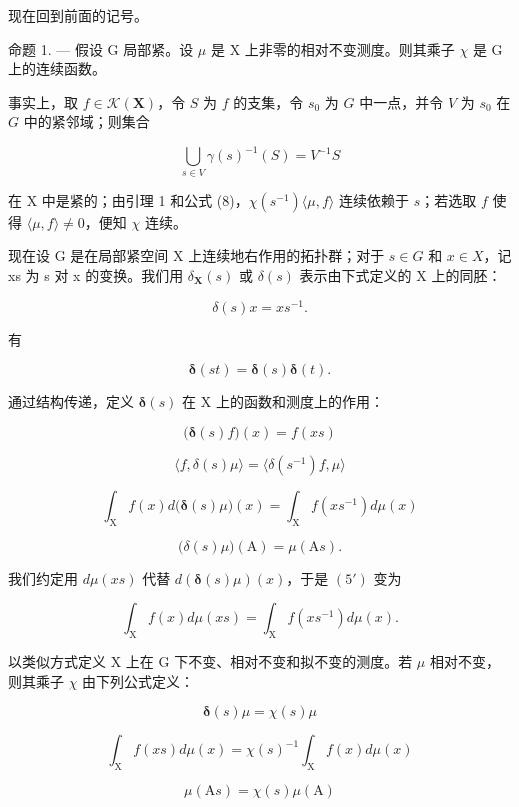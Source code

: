 现在回到前面的记号。

命题 1. --- 假设 G 局部紧。设 \(\mu\) 是 X 上非零的相对不变测度。则其乘子 \(\chi\) 是 G 上的连续函数。

事实上，取 \(f \in \mathcal{K}(\mathbf{X})\)，令 \(S\) 为 \(f\) 的支集，令 \(s_0\) 为 \(G\) 中一点，并令 \(V\) 为 \(s_0\) 在 \(G\) 中的紧邻域；则集合

\[
\bigcup_ {s \in V} \gamma (s) ^ {- 1} (S) = V ^ {- 1} S
\]

在 X 中是紧的；由引理 1 和公式 (8)，\(\chi(s^{-1})\langle\mu, f\rangle\) 连续依赖于 \(s\)；若选取 \(f\) 使得 \(\langle\mu, f\rangle \neq 0\)，便知 \(\chi\) 连续。

现在设 G 是在局部紧空间 X 上连续地右作用的拓扑群；对于 \(s \in G\) 和 \(x \in X\)，记 xs 为 s 对 x 的变换。我们用 \(\delta_{\mathbf{X}}(s)\) 或 \(\delta(s)\) 表示由下式定义的 X 上的同胚：

\[
\delta (s) x = x s ^ {- 1}.\tag{1'}
\]

有

\[
\boldsymbol {\delta} (s t) = \boldsymbol {\delta} (s) \boldsymbol {\delta} (t).\tag{2'}
\]

通过结构传递，定义 \(\boldsymbol{\delta}(s)\) 在 X 上的函数和测度上的作用：



\[
\big (\boldsymbol {\delta} (s) f \big) (x) = f (x s)\tag{3'}
\]

\[
\langle f, \delta (s) \mu \rangle = \langle \delta (s ^ {- 1}) f, \mu \rangle\tag{4'}
\]

\[
\int_ {\mathrm{X}} f (x) d \bigl (\pmb {\delta} (s) \mu \bigr) (x) = \int_ {\mathrm{X}} f (x s ^ {- 1}) d \mu (x)\tag{5'}
\]

\[
\big (\delta (s) \mu \big) (\mathrm{A}) = \mu (\mathrm{A} s).\tag{6'}
\]

我们约定用 \(d\mu(xs)\) 代替 \(d(\pmb{\delta}(s)\mu)(x)\)，于是 \((5')\) 变为

\[
\int_ {\mathrm{X}} f (x) d \mu (x s) = \int_ {\mathrm{X}} f (x s ^ {- 1}) d \mu (x).
\]

以类似方式定义 X 上在 G 下不变、相对不变和拟不变的测度。若 \(\mu\) 相对不变，则其乘子 \(\chi\) 由下列公式定义：



\[
\boldsymbol {\delta} (s) \mu = \chi (s) \mu\tag{7'}
\]

\[
\int_ {\mathrm{X}} f (x s) d \mu (x) = \chi (s) ^ {- 1} \int_ {\mathrm{X}} f (x) d \mu (x)\tag{8'}
\]

\[
\mu (\mathrm{A} s) = \chi (s) \mu (\mathrm{A})\tag{9'}
\]

